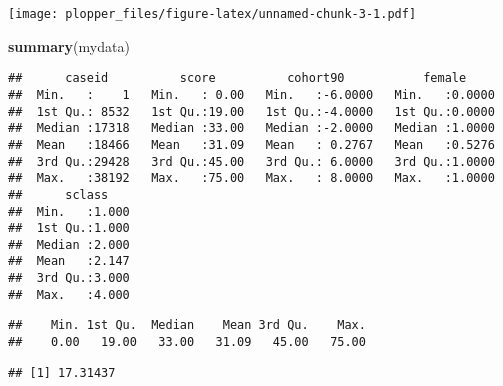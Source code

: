 \documentclass[]{article}
\newenvironment{Shaded}{\begin{snugshade}}{\end{snugshade}}
\newcommand{\KeywordTok}[1]{\textcolor[rgb]{0.13,0.29,0.53}{\textbf{#1}}}
\newcommand{\DataTypeTok}[1]{\textcolor[rgb]{0.13,0.29,0.53}{#1}}
\newcommand{\DecValTok}[1]{\textcolor[rgb]{0.00,0.00,0.81}{#1}}
\newcommand{\OperatorTok}[1]{\textcolor[rgb]{0.81,0.36,0.00}{\textbf{#1}}}
\newcommand{\NormalTok}[1]{#1}
\begin{document}
\begin{Shaded}
\end{Shaded}

\texttt{[image: plopper\_files/figure-latex/unnamed-chunk-3-1.pdf]}

\begin{Shaded}
\begin{Highlighting}[]
\KeywordTok{summary}\NormalTok{(mydata)}
\end{Highlighting}
\end{Shaded}

\begin{verbatim}
##      caseid          score          cohort90           female      
##  Min.   :    1   Min.   : 0.00   Min.   :-6.0000   Min.   :0.0000  
##  1st Qu.: 8532   1st Qu.:19.00   1st Qu.:-4.0000   1st Qu.:0.0000  
##  Median :17318   Median :33.00   Median :-2.0000   Median :1.0000  
##  Mean   :18466   Mean   :31.09   Mean   : 0.2767   Mean   :0.5276  
##  3rd Qu.:29428   3rd Qu.:45.00   3rd Qu.: 6.0000   3rd Qu.:1.0000  
##  Max.   :38192   Max.   :75.00   Max.   : 8.0000   Max.   :1.0000  
##      sclass     
##  Min.   :1.000  
##  1st Qu.:1.000  
##  Median :2.000  
##  Mean   :2.147  
##  3rd Qu.:3.000  
##  Max.   :4.000
\end{verbatim}

\begin{Shaded}
\end{Shaded}

\begin{verbatim}
##    Min. 1st Qu.  Median    Mean 3rd Qu.    Max. 
##    0.00   19.00   33.00   31.09   45.00   75.00
\end{verbatim}

\begin{Shaded}
\end{Shaded}

\begin{verbatim}
## [1] 17.31437
\end{verbatim}
\end{document}
